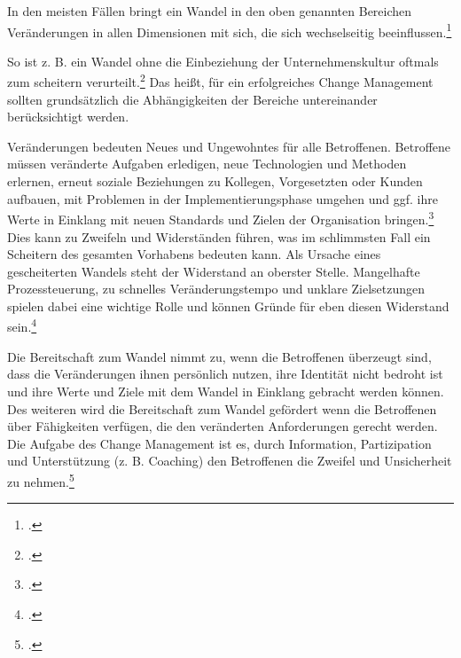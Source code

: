 In den meisten Fällen bringt ein Wandel in den oben genannten Bereichen Veränderungen in allen Dimensionen mit sich, die sich wechselseitig beeinflussen.\footcite[Vgl.][]{sonntag_change_2008} 

So ist z. B. ein Wandel ohne die Einbeziehung der Unternehmenskultur oftmals zum scheitern verurteilt.\footcite[Vgl.][]{lauer_change_2014} Das heißt, für ein erfolgreiches Change Management sollten grundsätzlich die Abhängigkeiten der Bereiche untereinander berücksichtigt werden.

Veränderungen bedeuten Neues und Ungewohntes für alle Betroffenen. 
Betroffene müssen veränderte Aufgaben erledigen, neue Technologien und Methoden erlernen, erneut soziale Beziehungen zu Kollegen, Vorgesetzten oder Kunden aufbauen, mit Problemen in der Implementierungsphase umgehen und ggf. ihre Werte in Einklang mit neuen Standards und Zielen der Organisation bringen.\footcite[Vgl.][]{sonntag_change_2008} Dies kann zu Zweifeln und Widerständen führen, was im schlimmsten Fall ein Scheitern des gesamten Vorhabens bedeuten kann. Als Ursache eines gescheiterten Wandels steht der Widerstand an oberster Stelle. Mangelhafte Prozessteuerung, zu schnelles Veränderungstempo und unklare Zielsetzungen spielen dabei eine wichtige Rolle und können Gründe für eben diesen Widerstand sein.\footcite[Vgl.][]{lauer_change_2014}

Die Bereitschaft zum Wandel nimmt zu, wenn die Betroffenen überzeugt sind, dass die Veränderungen ihnen persönlich nutzen, ihre Identität nicht bedroht ist und ihre Werte und Ziele mit dem Wandel in Einklang gebracht werden können. Des weiteren wird die Bereitschaft zum Wandel gefördert wenn die Betroffenen über Fähigkeiten verfügen, die den veränderten Anforderungen gerecht werden. Die Aufgabe des Change Management ist es, durch Information, Partizipation und Unterstützung (z. B. Coaching) den Betroffenen die Zweifel und Unsicherheit zu nehmen.\footcite[Vgl.][]{sonntag_change_2008}

